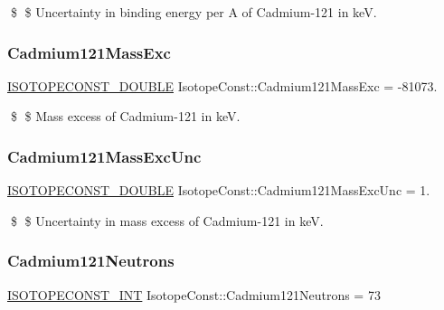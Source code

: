 \$ \$ Uncertainty in binding energy per A of Cadmium-\/121 in keV. \mbox{\label{group___isotope_const-_cadmium-_cd121_gaef46855117638ed070824aa7cde784fd}} 
\subsubsection{\texorpdfstring{Cadmium121\+Mass\+Exc}{Cadmium121MassExc}}
{\footnotesize\ttfamily \mbox{\hyperlink{group___isotope_const-_macros_ga8f45a7272ce02c0b4c65c44636ed719a}{I\+S\+O\+T\+O\+P\+E\+C\+O\+N\+S\+T\+\_\+\+D\+O\+U\+B\+LE}} Isotope\+Const\+::\+Cadmium121\+Mass\+Exc = -\/81073.}

\$ \$ Mass excess of Cadmium-\/121 in keV. \mbox{\label{group___isotope_const-_cadmium-_cd121_ga45a67b3502a3667696e7d6d67e1b1187}} 
\subsubsection{\texorpdfstring{Cadmium121\+Mass\+Exc\+Unc}{Cadmium121MassExcUnc}}
{\footnotesize\ttfamily \mbox{\hyperlink{group___isotope_const-_macros_ga8f45a7272ce02c0b4c65c44636ed719a}{I\+S\+O\+T\+O\+P\+E\+C\+O\+N\+S\+T\+\_\+\+D\+O\+U\+B\+LE}} Isotope\+Const\+::\+Cadmium121\+Mass\+Exc\+Unc = 1.}

\$ \$ Uncertainty in mass excess of Cadmium-\/121 in keV. \mbox{\label{group___isotope_const-_cadmium-_cd121_ga389d6e76f35e7a294244810bb08ad235}} 
\subsubsection{\texorpdfstring{Cadmium121\+Neutrons}{Cadmium121Neutrons}}
{\footnotesize\ttfamily \mbox{\hyperlink{group___isotope_const-_macros_ga5f18360b3e99483a35c32d789e62621c}{I\+S\+O\+T\+O\+P\+E\+C\+O\+N\+S\+T\+\_\+\+I\+NT}} Isotope\+Const\+::\+Cadmium121\+Neutrons = 73}

